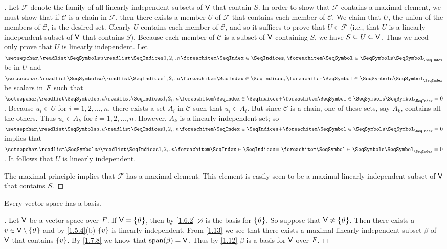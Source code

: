 \begin{proof}[]
  Let \(\mathcal{F}\) denote the family of all linearly independent subsets of \(\mathsf{V}\) that contain \(S\).
  In order to show that \(\mathcal{F}\) contains a maximal element, we must show that if \(\mathcal{C}\) is a chain in \(\mathcal{F}\), then there exists a member \(U\) of \(\mathcal{F}\) that contains each member of \(\mathcal{C}\).
  We claim that \(U\), the union of the members of \(\mathcal{C}\), is the desired set.
  Clearly \(U\) contains each member of \(\mathcal{C}\), and so it suffices to prove that \(U \in \mathcal{F}\)
  (i.e., that \(U\) is a linearly independent subset of \(\mathsf{V}\) that contains \(S\)).
  Because each member of \(\mathcal{C}\) is a subset of \(\mathsf{V}\) containing \(S\), we have \(S \subseteq U \subseteq \mathsf{V}\).
  Thus we need only prove that \(U\) is linearly independent.
  Let \(\seq{u}{1,2,,n}\) be in \(U\) and \(\seq{a}{1,2,,n}\) be scalars in \(\mathit{F}\) such that \(\seq[+]{a,u}{1,2,,n} = 0\).
  Because \(u_i \in U\) for \(i = 1, 2, \dots, n\), there exists a set \(A_i\) in \(\mathcal{C}\) such that \(u_i \in A_i\).
  But since \(\mathcal{C}\) is a chain, one of these sets, say \(A_k\), contains all the others.
  Thus \(u_i \in A_k\) for \(i = 1, 2, \dots, n\).
  However, \(A_k\) is a linearly independent set;
  so \(\seq[+]{a,u}{1,2,,n} = 0\) implies that \(\seq[=]{a}{1,2,,n} = 0\).
  It follows that \(U\) is linearly independent.

  The maximal principle implies that \(\mathcal{F}\) has a maximal element.
  This element is easily seen to be a maximal linearly independent subset of \(\mathsf{V}\) that contains \(S\).
\end{proof}

\begin{cor}\label{1.7.10}
  Every vector space has a basis.
\end{cor}

\begin{proof}[]
  Let \(\mathsf{V}\) be a vector space over \(\mathit{F}\).
  If \(\mathsf{V} = \left\lbrace\mathit{0}\right\rbrace\), then by \cref{1.6.2} \(\varnothing\) is the basis for \(\left\lbrace\mathit{0}\right\rbrace\).
  So suppose that \(\mathsf{V} \neq \left\lbrace\mathit{0}\right\rbrace\).
  Then there exists a \(v \in \mathsf{V} \setminus \left\lbrace\mathit{0}\right\rbrace\) and by \cref{1.5.4}(b) \(\left\lbrace v\right\rbrace\) is linearly independent.
  From \cref{1.13} we see that there exists a maximal linearly independent subset \(\beta\) of \(\mathsf{V}\) that contains \(\left\lbrace v\right\rbrace\).
  By \cref{1.7.8} we know that \(\spn{\beta} = \V\).
  Thus by \cref{1.12} \(\beta\) is a basis for \(\mathsf{V}\) over \(\mathit{F}\).
\end{proof}

